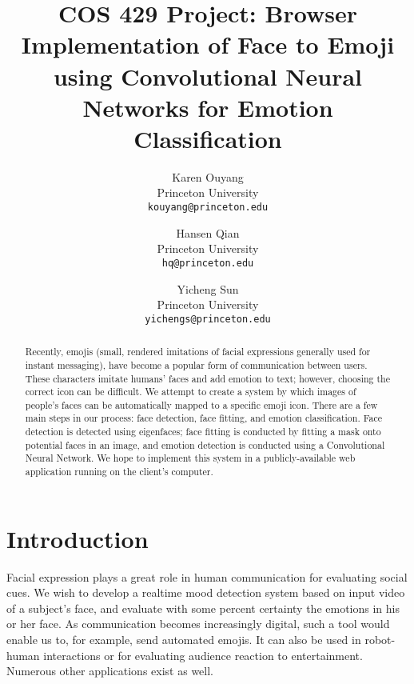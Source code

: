 \documentclass[10pt,twocolumn,letterpaper]{article}
\begin{document}
\title{COS 429 Project: Browser Implementation of Face to Emoji using Convolutional Neural Networks for Emotion Classification}

\author{Karen Ouyang\\
Princeton University\\
{\tt\small kouyang@princeton.edu}
\and
Hansen Qian\\
Princeton University\\
{\tt\small hq@princeton.edu}
\and
Yicheng Sun\\
Princeton University\\
{\tt\small yichengs@princeton.edu}
}

\maketitle

\begin{abstract}
   Recently, emojis (small, rendered imitations of facial expressions generally used for instant messaging), have become a popular form of communication between users. These characters imitate humans' faces and add emotion to text; however, choosing the correct icon can be difficult.  We attempt to create a system by which images of people's faces can be automatically mapped to a specific emoji icon. There are a few main steps in our process: face detection, face fitting, and emotion classification. Face detection is detected using eigenfaces; face fitting is conducted by fitting a mask onto potential faces in an image, and emotion detection is conducted using a Convolutional Neural Network. We hope to implement this system in a publicly-available web application running on the client's computer.
\end{abstract}

\section{Introduction}

Facial expression plays a great role in human communication for evaluating social cues. We wish to develop a realtime mood detection system based on input video of a subject's face, and evaluate with some percent certainty the emotions in his or her face. As communication becomes increasingly digital, such a tool would enable us to, for example, send automated emojis. It can also be used in robot-human interactions or for evaluating audience reaction to entertainment. Numerous other applications exist as well.
\end{document}
